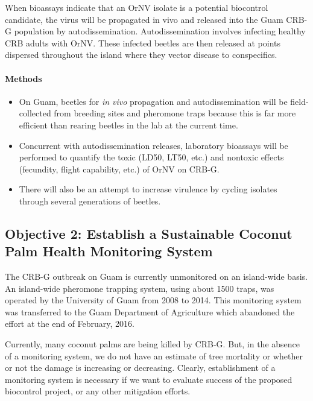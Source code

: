 \documentclass[14pt,english,letterpaper]{scrartcl}
\begin{document}
When bioassays indicate that an OrNV isolate is a potential biocontrol candidate, the virus will be
propagated in vivo and released into the Guam CRB-G population by autodissemination. Autodissemination involves infecting healthy CRB adults with OrNV. These infected beetles are then released at points dispersed throughout the island where they vector disease to conspecifics. 

\paragraph{Methods}

\begin{itemize}
\item On Guam, beetles for \textit{in vivo} propagation and autodissemination will be field-collected from
breeding sites and pheromone traps because this is far more efficient than rearing beetles in the lab at
the current time.

\item Concurrent with autodissemination releases, laboratory bioassays will be performed to quantify the toxic
(LD50, LT50, etc.) and nontoxic effects (fecundity, flight capability, etc.) of OrNV on CRB-G.

\item  There will also
be an attempt to increase virulence by cycling isolates through several generations of beetles. \end{itemize}

\subsection{Objective 2: Establish a Sustainable Coconut Palm Health Monitoring System}

The CRB-G outbreak on Guam is currently unmonitored on an island-wide basis. An island-wide
pheromone trapping system, using about 1500 traps, was operated by the University of Guam from 2008
to 2014. This monitoring system was transferred to the Guam Department of Agriculture which
abandoned the effort at the end of February, 2016. 

Currently, many coconut palms are being killed by
CRB-G. But, in the absence of a monitoring system, we do not have an estimate of tree mortality or
whether or not the damage is increasing or decreasing.
Clearly, establishment of a monitoring system is necessary if we want to evaluate success of the
proposed biocontrol project, or any other mitigation efforts. 
\end{document}
